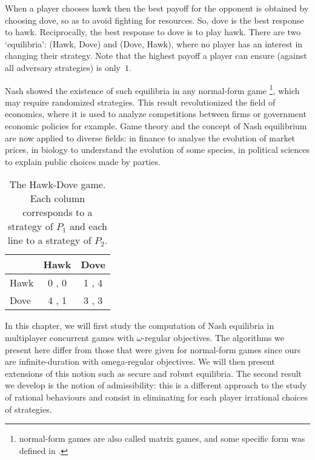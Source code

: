 When a player chooses hawk then the best payoff for the opponent is
obtained by choosing dove, so as to avoid fighting for resources.
So, dove is the best response to hawk. Reciprocally, the best response to
dove is to play hawk. There are two `equilibria': (Hawk, Dove) and
(Dove, Hawk), where no player has an interest in changing their
strategy. Note that the highest payoff a player can ensure
(against all adversary strategies) is only~$1$.

Nash showed the existence of such equilibria in any normal-form game
\footnote{normal-form games are also called matrix games, and some
specific form was defined in .},
which may require randomized strategies. This result
revolutionized the field of economics, where it is used to analyze
competitions between firms or government economic policies for example.
Game theory and the concept of Nash equilibrium are now applied to
diverse fields: in finance to analyse the evolution of market prices, in
biology to understand the evolution of some species, in political
sciences to explain public choices made by parties.

\begin{table}
  \caption{The Hawk-Dove game. Each column corresponds to a strategy of
    \(P_1\) and each line to a strategy of \(P_2\).}
  \label{13-tab:hawk-dove}
  \begin{center}
    \begin{tabular}[c]{|@{~}l@{~}|@{~}c@{~} @{~}c@{~}|}
      \hline
      & Hawk & Dove \\
      \hline
      Hawk & 0 , 0 & 1 , 4 \\
      Dove & 4 , 1 & 3 , 3 \\
      \hline
    \end{tabular}
  \end{center}
\end{table}

\medskip
In this chapter, we will first study the computation of Nash
equilibria in multiplayer concurrent games with $\omega$-regular
objectives. The algorithms we present here differ from those that were
given for normal-form games since ours are infinite-duration with
omega-regular objectives. We will then present extensions of this notion
such as secure and
robust equilibria. The second result we develop is
the notion of admissibility: this is a different approach to the study
of rational behaviours and consist in eliminating for each player
irrational choices of strategies.


